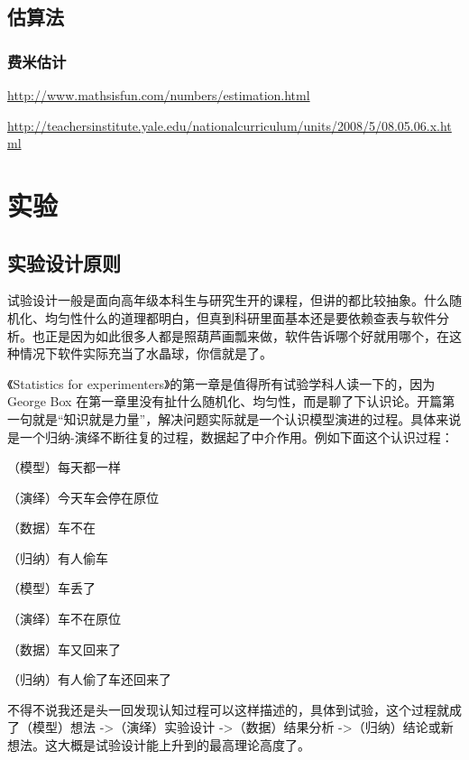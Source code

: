 \documentclass[]{tufte-book}
\begin{document}
\hypertarget{ux4f30ux7b97ux6cd5}{%
\section{估算法}\label{ux4f30ux7b97ux6cd5}}

\hypertarget{ux8d39ux7c73ux4f30ux8ba1}{%
\subsection{费米估计}\label{ux8d39ux7c73ux4f30ux8ba1}}

\url{http://www.mathsisfun.com/numbers/estimation.html}

\url{http://teachersinstitute.yale.edu/nationalcurriculum/units/2008/5/08.05.06.x.html}

\hypertarget{exp}{%
\chapter{实验}\label{exp}}

\hypertarget{ux5b9eux9a8cux8bbeux8ba1ux539fux5219}{%
\section{实验设计原则}\label{ux5b9eux9a8cux8bbeux8ba1ux539fux5219}}

试验设计一般是面向高年级本科生与研究生开的课程，但讲的都比较抽象。什么随机化、均匀性什么的道理都明白，但真到科研里面基本还是要依赖查表与软件分析。也正是因为如此很多人都是照葫芦画瓢来做，软件告诉哪个好就用哪个，在这种情况下软件实际充当了水晶球，你信就是了。

《Statistics for experimenters》的第一章是值得所有试验学科人读一下的，因为George Box 在第一章里没有扯什么随机化、均匀性，而是聊了下认识论。开篇第一句就是``知识就是力量''，解决问题实际就是一个认识模型演进的过程。具体来说是一个归纳-演绎不断往复的过程，数据起了中介作用。例如下面这个认识过程：

（模型）每天都一样

（演绎）今天车会停在原位

（数据）车不在

（归纳）有人偷车

（模型）车丢了

（演绎）车不在原位

（数据）车又回来了

（归纳）有人偷了车还回来了

不得不说我还是头一回发现认知过程可以这样描述的，具体到试验，这个过程就成了（模型）想法 -\textgreater{}（演绎）实验设计 -\textgreater{}（数据）结果分析 -\textgreater{}（归纳）结论或新想法。这大概是试验设计能上升到的最高理论高度了。
\end{document}

